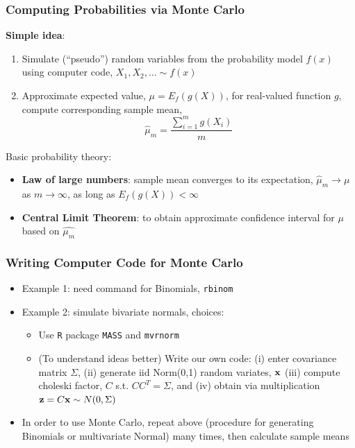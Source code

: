 \documentclass{beamer}
\begin{document}
\begin{frame}
  \frametitle{Computing Probabilities via Monte Carlo}
  {\bf Simple idea}: 
\begin{enumerate}
\item Simulate (``pseudo'') random variables from the probability
  model $f(x)$ using computer code, $X_1,X_2,\dots \sim f(x)$
\item Approximate expected value, $\mu=E_f(g(X))$, for 
  real-valued function $g$, compute corresponding sample
  mean, $$\hat{\mu}_m = \frac{\sum_{i=1}^m g(X_i)}{m}$$
\end{enumerate}
Basic probability theory:
\begin{itemize}
\item {\bf Law of large numbers}: sample mean converges to its expectation,
  $\hat{\mu}_m \rightarrow \mu$ as $m\rightarrow \infty$, as long as
  $E_f(g(X)) <\infty$
\item {\bf Central Limit Theorem}: to obtain approximate confidence interval
  for $\mu$ based on $\hat{\mu_m}$
\end{itemize}
\end{frame}

\begin{frame}
  \frametitle{Writing Computer Code for Monte Carlo}
\begin{itemize}
\item Example 1: need command for Binomials, {\tt rbinom}
\item Example 2: simulate bivariate normals, choices:
\begin{itemize}
\item Use {\tt R} package {\tt MASS} and {\tt mvrnorm}
\item (To understand ideas better) Write our own code: (i) enter 
  covariance matrix $\Sigma$, (ii) generate iid
  Norm(0,1) random variates, ${\bf x}$ (iii) compute choleski factor, $C$
  s.t. $CC^T=\Sigma$, and (iv) obtain via multiplication ${\bf z} = C{\bf x}\sim
  N(0,\Sigma)$
\end{itemize}
\item In order to use Monte Carlo, repeat above (procedure for
  generating Binomials or multivariate Normal) many times, then
  calculate sample means
\end{itemize}
\end{frame}
\end{document}
